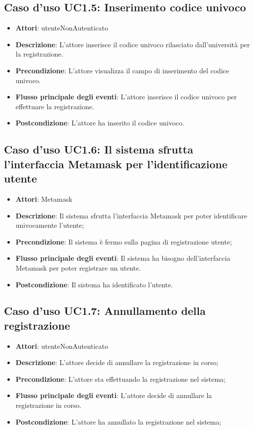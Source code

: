 \subsection{Caso d'uso \texorpdfstring{UC1.5}{UC1.5}: Inserimento codice univoco}
\begin{itemize}
\item \textbf{Attori}: utenteNonAutenticato
\item \textbf{Descrizione}: L'attore inserisce il codice univoco rilasciato dall'università per la registrazione.
\item \textbf{Precondizione}: L'attore visualizza il campo di inserimento del codice univoco.
\item \textbf{Flusso principale degli eventi}: L'attore inserisce il codice univoco per effettuare la registrazione.
\item \textbf{Postcondizione}: L'attore ha inserito il codice univoco.
\end{itemize}
\subsection{Caso d'uso \texorpdfstring{UC1.6}{UC1.6}: Il sistema sfrutta l'interfaccia Metamask per l'identificazione utente}
\begin{itemize}
\item \textbf{Attori}: Metamask
\item \textbf{Descrizione}: Il sistema sfrutta l'interfaccia Metamask per poter identificare univocamente l'utente;
\item \textbf{Precondizione}: Il sistema è fermo sulla pagina di registrazione utente;
\item \textbf{Flusso principale degli eventi}: Il sistema ha bisogno dell'interfaccia Metamask per poter registrare un utente.
\item \textbf{Postcondizione}: Il sistema ha identificato l'utente.
\end{itemize}
\subsection{Caso d'uso \texorpdfstring{UC1.7}{UC1.7}: Annullamento della registrazione}
\begin{itemize}
\item \textbf{Attori}: utenteNonAutenticato
\item \textbf{Descrizione}: L'attore decide di annullare la registrazione in corso;
\item \textbf{Precondizione}: L'attore sta effettuando la registrazione nel sistema;
\item \textbf{Flusso principale degli eventi}: L'attore decide di annullare la registrazione in corso.
\item \textbf{Postcondizione}: L'attore ha annullato la registrazione nel sistema;
\end{itemize}
